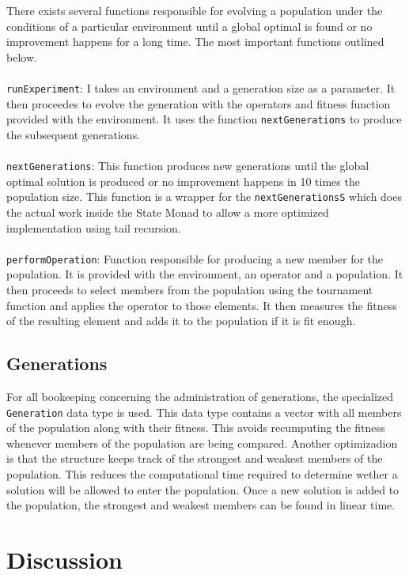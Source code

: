 \documentclass[10pt]{article}
\begin{document}
There exists several functions responsible for evolving a population under the conditions of a particular environment until a global optimal is found or no improvement happens for a long time. The most important functions outlined below.
\\\\
\verb+runExperiment+: I takes an environment and a generation size as a parameter. It then proceedes to evolve the generation with the operators and fitness function provided with the environment. It uses the function \verb+nextGenerations+ to produce the subsequent generations.
\\\\
\verb+nextGenerations+: This function produces new generations until the global optimal solution is produced or no improvement happens in 10 times the population size. This function is a wrapper for the \verb+nextGenerationsS+ which does the actual work inside the State Monad to allow a more optimized implementation using tail recursion.
\\\\
\verb+performOperation+: Function responsible for producing a new member for the population. It is provided with the environment, an operator and a population. It then proceeds to select members from the population using the tournament function and applies the operator to those elements. It then measures the fitness of the resulting element and adds it to the population if it is fit enough.

\subsection{Generations}

For all bookeeping concerning the administration of generations, the specialized \verb+Generation+ data type is used. This data type contains a vector with all members of the population along with their fitness. This avoids recumputing the fitness whenever members of the population are being compared. Another optimizadion is that the structure keeps track of the strongest and weakest members of the population. This reduces the computational time required to determine wether a solution will be allowed to enter the population. Once a new solution is added to the population, the strongest and weakest members can be found in linear time.

\section{Discussion}
\end{document}
